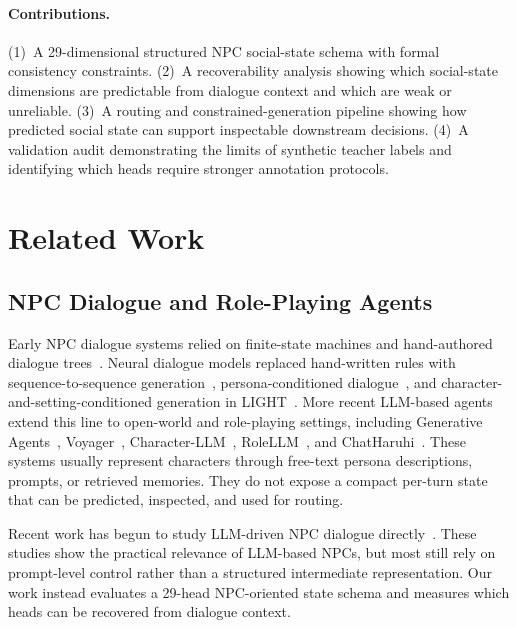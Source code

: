 \documentclass[11pt]{article}
\begin{document}
\paragraph{Contributions.}
(1)~A 29-dimensional structured NPC social-state schema with formal consistency constraints.
(2)~A recoverability analysis showing which social-state dimensions are predictable from dialogue context and which are weak or unreliable.
(3)~A routing and constrained-generation pipeline showing how predicted social state can support inspectable downstream decisions.
(4)~A validation audit demonstrating the limits of synthetic teacher labels and identifying which heads require stronger annotation protocols.

\section{Related Work}
\label{sec:related}

\subsection{NPC Dialogue and Role-Playing Agents}

Early NPC dialogue systems relied on finite-state machines and hand-authored dialogue trees~\cite{walker2006individual}.
Neural dialogue models replaced hand-written rules with sequence-to-sequence generation~\cite{bordes2017learning}, persona-conditioned dialogue~\cite{zhang2018personalizing}, and character-and-setting-conditioned generation in LIGHT~\cite{urbanek2019learning}.
More recent LLM-based agents extend this line to open-world and role-playing settings, including Generative Agents~\cite{park2023generative}, Voyager~\cite{wang2023voyager}, Character-LLM~\cite{shao2023character}, RoleLLM~\cite{wang2024rolellm}, and ChatHaruhi~\cite{li2023chatharuhi}.
These systems usually represent characters through free-text persona descriptions, prompts, or retrieved memories.
They do not expose a compact per-turn state that can be predicted, inspected, and used for routing.

Recent work has begun to study LLM-driven NPC dialogue directly~\cite{rimer2025talking,song2025llmnpc,buakhaw2025deflanderization,ploug2025open}.
These studies show the practical relevance of LLM-based NPCs, but most still rely on prompt-level control rather than a structured intermediate representation.
Our work instead evaluates a 29-head NPC-oriented state schema and measures which heads can be recovered from dialogue context.
\end{document}
